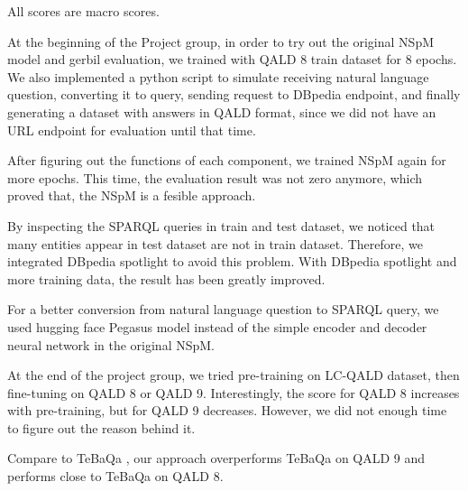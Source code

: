 All scores are macro scores. 

At the beginning of the Project group,
in order to try out the original NSpM model and gerbil evaluation,
we trained with QALD 8 train dataset for 8 epochs. 
We also implemented a python script to simulate 
receiving natural language question, 
converting it to query,
sending request to DBpedia endpoint, 
and finally generating a dataset with answers in QALD format,
since we did not have an URL endpoint for evaluation until that time. 

After figuring out the functions of each component, 
we trained NSpM again for more epochs. 
This time, the evaluation result was not zero anymore, 
which proved that,
the NSpM is a fesible approach. 

By inspecting the SPARQL queries in train and test dataset, 
we noticed that
many entities appear in test dataset are not in train dataset. 
Therefore, we integrated DBpedia spotlight to avoid this problem. 
With DBpedia spotlight and more training data, 
the result has been greatly improved. 

For a better conversion from natural language question to SPARQL query, 
we used hugging face Pegasus model instead of the simple encoder and decoder neural network in the original NSpM.

At the end of the project group, we tried pre-training on LC-QALD dataset, then fine-tuning on QALD 8 or QALD 9. 
Interestingly, the score for QALD 8 increases with pre-training, 
but for QALD 9 decreases. 
However, we did not enough time to figure out the reason behind it. 

Compare to TeBaQa \cite{DBLP:journals/corr/abs-2103-06752},
our approach overperforms TeBaQa on QALD 9 and performs close to TeBaQa on QALD 8.